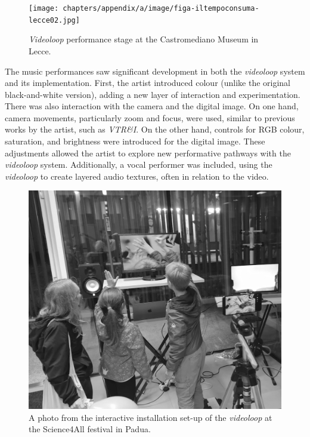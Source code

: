 \begin{figure}[!h]
    \centering
    \texttt{[image: chapters/appendix/a/image/figa-iltempoconsuma-lecce02.jpg]}
    \caption{\textit{Videoloop} performance stage at the Castromediano Museum in Lecce.}
    \label{fig:aa-iltempoconsuma-lecce02}
\end{figure}
The music performances saw significant development in both the \textit{videoloop} system and its implementation. First, the artist introduced colour (unlike the original black-and-white version), adding a new layer of interaction and experimentation. There was also interaction with the camera and the digital image. On one hand, camera movements, particularly zoom and focus, were used, similar to previous works by the artist, such as \textit{VTR\&I}. On the other hand, controls for RGB colour, saturation, and brightness were introduced for the digital image. These adjustments allowed the artist to explore new performative pathways with the \textit{videoloop} system. Additionally, a vocal performer was included, using the \textit{videoloop} to create layered audio textures, often in relation to the video.\\
\begin{figure}[!h]
    \centering
    \includegraphics[width=\linewidth]{chapters/appendix/a/image/figa-iltempoconsuma-installation.png}
    \caption{A photo from the interactive installation set-up of the \textit{videoloop} at the Science4All festival in Padua.}
    \label{fig:aa-iltempoconsuma-installation}
\end{figure}
